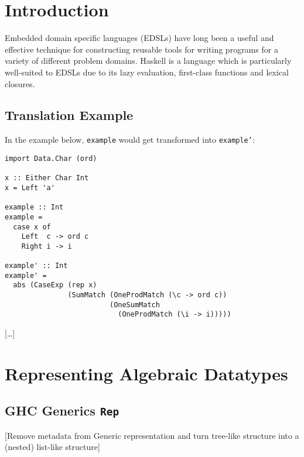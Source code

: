 \documentclass[acmsmall]{acmart}
\newcommand{\ttt}{\texttt}
\begin{document}
\maketitle

\section{Introduction}

Embedded domain specific languages (EDSLs) have long been a useful and effective
technique for constructing reusable tools for writing programs for a variety of
different problem domains. Haskell is a language which is particularly
well-suited to EDSLs due to its lazy evaluation, first-class functions and
lexical closures.

\subsection{Translation Example} %

In the example below, \ttt{example} would get transformed into \ttt{example'}:

\begin{lstlisting}
import Data.Char (ord)

x :: Either Char Int
x = Left 'a'

example :: Int
example =
  case x of
    Left  c -> ord c
    Right i -> i

example' :: Int
example' =
  abs (CaseExp (rep x)
               (SumMatch (OneProdMatch (\c -> ord c))
                         (OneSumMatch
                           (OneProdMatch (\i -> i)))))
\end{lstlisting}

[\ldots]

\section{Representing Algebraic Datatypes}

\subsection{GHC Generics \ttt{Rep}}

[Remove metadata from Generic representation and turn tree-like structure into a (nested) list-like structure]
\end{document}
